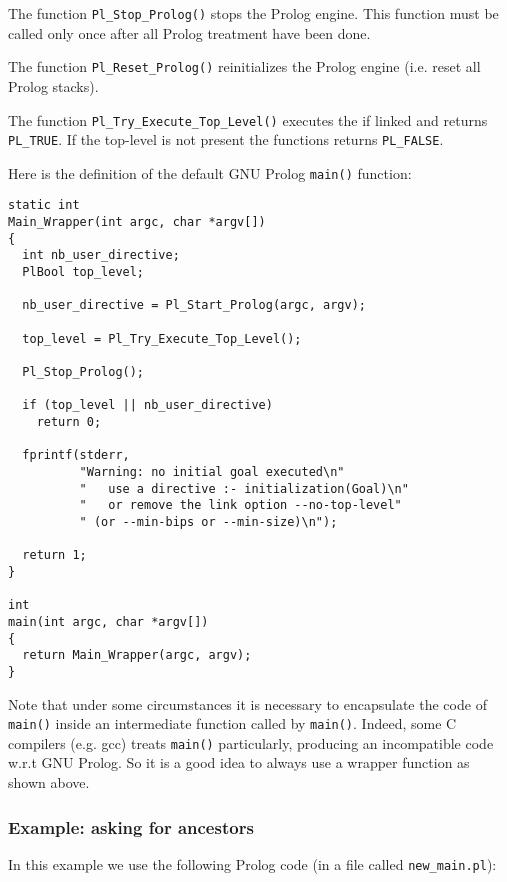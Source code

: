 The function \texttt{Pl\_Stop\_Prolog()} stops the Prolog engine. This function
must be called only once after all Prolog treatment have been done.

The function \texttt{Pl\_Reset\_Prolog()} reinitializes the Prolog engine
(i.e. reset all Prolog stacks).

The function \texttt{Pl\_Try\_Execute\_Top\_Level()} executes the
 if linked  and returns
\texttt{PL\_TRUE}. If the top-level is not present the functions returns
\texttt{PL\_FALSE}.

Here is the definition of the default GNU Prolog \texttt{main()} function:

\begin{Indentation}
\begin{verbatim}
static int
Main_Wrapper(int argc, char *argv[])
{
  int nb_user_directive;
  PlBool top_level;

  nb_user_directive = Pl_Start_Prolog(argc, argv);

  top_level = Pl_Try_Execute_Top_Level();

  Pl_Stop_Prolog();

  if (top_level || nb_user_directive)
    return 0;

  fprintf(stderr,
          "Warning: no initial goal executed\n"
          "   use a directive :- initialization(Goal)\n"
          "   or remove the link option --no-top-level"
          " (or --min-bips or --min-size)\n");

  return 1;
}

int
main(int argc, char *argv[])
{
  return Main_Wrapper(argc, argv);
}
\end{verbatim}
\end{Indentation}

Note that under some circumstances it is necessary to encapsulate the code of
\texttt{main()} inside an intermediate function called by
\texttt{main()}. Indeed, some C compilers (e.g. gcc) treats \texttt{main()}
particularly, producing an incompatible code w.r.t GNU Prolog. So it is a
good idea to always use a wrapper function as shown above.

\subsubsection{Example: asking for ancestors}

In this example we use the following Prolog code (in a file called
\texttt{new\_main.pl}):

